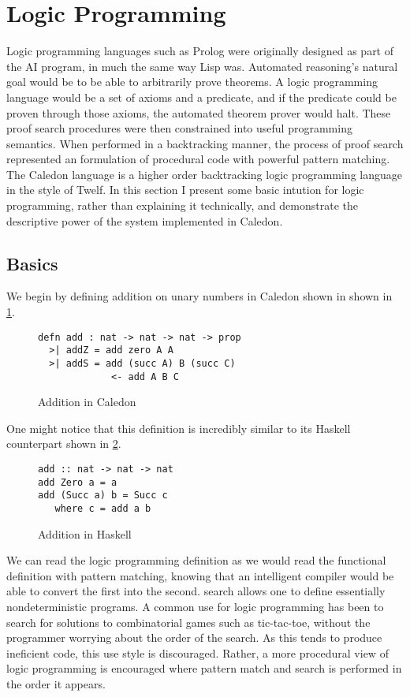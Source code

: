\section{Logic Programming}

Logic programming languages such as Prolog were originally designed as part of the AI
program, in much the same way Lisp was. Automated reasoning’s natural goal would
be to be able to arbitrarily prove theorems. A logic programming language would be
a set of axioms and a predicate, and if the predicate could be proven through those axioms,
the automated theorem prover would halt. These proof search procedures were
then constrained into useful programming semantics. When performed in a backtracking
manner, the process of proof search represented an formulation of procedural code
with powerful pattern matching. The Caledon language is a higher order backtracking
logic programming language in the style of Twelf. In this section I present some basic
intution for logic programming, rather than explaining it technically, and demonstrate the 
descriptive power of the system implemented in Caledon.

\FloatBarrier
\subsection{Basics}
We begin by defining addition on unary numbers in Caledon shown in shown in \ref{code:add}.

\begin{figure}[H]
\begin{lstlisting}
defn add : nat -> nat -> nat -> prop
  >| addZ = add zero A A
  >| addS = add (succ A) B (succ C) 
             <- add A B C
\end{lstlisting}
\caption{Addition in Caledon}
\label{code:add}
\end{figure}

One might notice that this definition is incredibly similar to its Haskell counterpart shown in \ref{code:hask}.

\begin{figure}[H]
\begin{lstlisting}
add :: nat -> nat -> nat
add Zero a = a
add (Succ a) b = Succ c
   where c = add a b
\end{lstlisting}
\caption{Addition in Haskell}
\label{code:hask}
\end{figure}

We can read the logic programming definition as we would read the functional definition with pattern
matching, knowing that an intelligent compiler would be able to convert the first into the second.  
search allows one to define essentially nondeterministic programs. A common use for
logic programming has been to search for solutions to combinatorial games such as tic-tac-toe, 
without the programmer worrying about the order of the search. As this tends
to produce ineficient code, this use style is discouraged. Rather, a more procedural view of logic programming is encouraged where pattern match and search is performed
in the order it appears.

